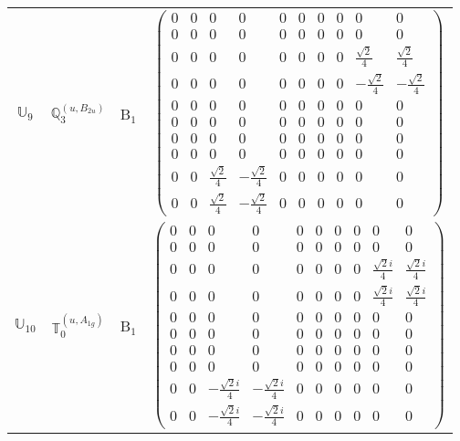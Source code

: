 \documentclass[fleqn,10pt,landscape]{article}
\begin{document}
\begin{itemize}
\begin{center}
\begin{longtable}{c|c|c|c}
$ \mathbb{U}_{9} $ & $\mathbb{Q}_{3}^{(u,B_{2u})}$ & B$_{1}$ & $\begin{pmatrix} 0 & 0 & 0 & 0 & 0 & 0 & 0 & 0 & 0 & 0 \\ 0 & 0 & 0 & 0 & 0 & 0 & 0 & 0 & 0 & 0 \\ 0 & 0 & 0 & 0 & 0 & 0 & 0 & 0 & \frac{\sqrt{2}}{4} & \frac{\sqrt{2}}{4} \\ 0 & 0 & 0 & 0 & 0 & 0 & 0 & 0 & - \frac{\sqrt{2}}{4} & - \frac{\sqrt{2}}{4} \\ 0 & 0 & 0 & 0 & 0 & 0 & 0 & 0 & 0 & 0 \\ 0 & 0 & 0 & 0 & 0 & 0 & 0 & 0 & 0 & 0 \\ 0 & 0 & 0 & 0 & 0 & 0 & 0 & 0 & 0 & 0 \\ 0 & 0 & 0 & 0 & 0 & 0 & 0 & 0 & 0 & 0 \\ 0 & 0 & \frac{\sqrt{2}}{4} & - \frac{\sqrt{2}}{4} & 0 & 0 & 0 & 0 & 0 & 0 \\ 0 & 0 & \frac{\sqrt{2}}{4} & - \frac{\sqrt{2}}{4} & 0 & 0 & 0 & 0 & 0 & 0 \end{pmatrix}$ \\
$ \mathbb{U}_{10} $ & $\mathbb{T}_{0}^{(u,A_{1g})}$ & B$_{1}$ & $\begin{pmatrix} 0 & 0 & 0 & 0 & 0 & 0 & 0 & 0 & 0 & 0 \\ 0 & 0 & 0 & 0 & 0 & 0 & 0 & 0 & 0 & 0 \\ 0 & 0 & 0 & 0 & 0 & 0 & 0 & 0 & \frac{\sqrt{2} i}{4} & \frac{\sqrt{2} i}{4} \\ 0 & 0 & 0 & 0 & 0 & 0 & 0 & 0 & \frac{\sqrt{2} i}{4} & \frac{\sqrt{2} i}{4} \\ 0 & 0 & 0 & 0 & 0 & 0 & 0 & 0 & 0 & 0 \\ 0 & 0 & 0 & 0 & 0 & 0 & 0 & 0 & 0 & 0 \\ 0 & 0 & 0 & 0 & 0 & 0 & 0 & 0 & 0 & 0 \\ 0 & 0 & 0 & 0 & 0 & 0 & 0 & 0 & 0 & 0 \\ 0 & 0 & - \frac{\sqrt{2} i}{4} & - \frac{\sqrt{2} i}{4} & 0 & 0 & 0 & 0 & 0 & 0 \\ 0 & 0 & - \frac{\sqrt{2} i}{4} & - \frac{\sqrt{2} i}{4} & 0 & 0 & 0 & 0 & 0 & 0 \end{pmatrix}$ \\

\end{longtable}
\end{center}
\end{itemize}
\end{document}
